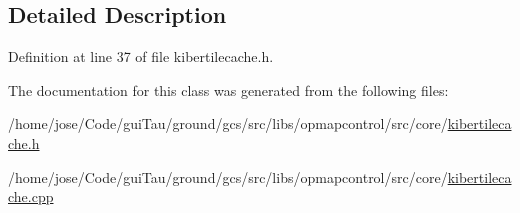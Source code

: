 \subsection{Detailed Description}


Definition at line 37 of file kibertilecache.\-h.



The documentation for this class was generated from the following files\-:\begin{DoxyCompactItemize}
\item 
/home/jose/\-Code/gui\-Tau/ground/gcs/src/libs/opmapcontrol/src/core/\hyperlink{kibertilecache_8h}{kibertilecache.\-h}\item 
/home/jose/\-Code/gui\-Tau/ground/gcs/src/libs/opmapcontrol/src/core/\hyperlink{kibertilecache_8cpp}{kibertilecache.\-cpp}\end{DoxyCompactItemize}
